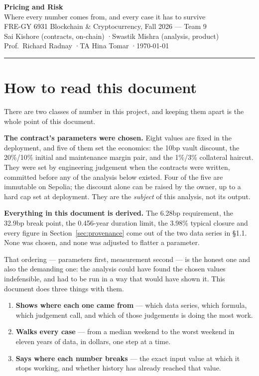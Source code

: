 \documentclass[11pt,a4paper]{article}
\begin{document}
\begin{center}
{\LARGE\bfseries Pricing and Risk}\\[4pt]
{\large Where every number comes from, and every case it has to survive}\\[10pt]
{\normalsize FRE-GY 6931 Blockchain \& Cryptocurrency, Fall 2026 — Team 9}\\[2pt]
{\small Sai Kishore (contracts, on-chain) \quad·\quad Swastik Mishra (analysis, product)}\\[2pt]
{\small Prof.\ Richard Radnay \quad·\quad TA Hina Tomar \quad·\quad \today}
\end{center}
\vspace{4pt}

\hrule
\vspace{10pt}

\section*{How to read this document}

There are two classes of number in this project, and keeping them apart is the whole
point of this document.

\textbf{The contract's parameters were chosen.} Eight values are fixed in the deployment,
and five of them set the economics: the 10bp vault discount, the 20\%/10\% initial and
maintenance margin pair, and the 1\%/3\% collateral haircut. They were set by engineering
judgement when the contracts were written, committed before any of the analysis below
existed. Four of the five are immutable on Sepolia; the discount alone can be raised by the owner,
up to a hard cap set at deployment. They are the \emph{subject} of this analysis,
not its output.

\textbf{Everything in this document is derived.} The 6.28bp requirement, the 32.9bp break
point, the 0.456-year duration limit, the 3.98\% typical closure and every figure in
Section~\ref{sec:provenance} come out of the two data series in \S1.1. None was chosen,
and none was adjusted to flatter a parameter.

That ordering — parameters first, measurement second — is the honest one and also the
demanding one: the analysis could have found the chosen values indefensible, and had to be
run in a way that would have shown it. This document does three things with them.

\begin{enumerate}
\item \textbf{Shows where each one came from} — which data series, which formula, which
      judgement call, and which of those judgements is doing the most work.
\item \textbf{Walks every case} — from a median weekend to the worst weekend in eleven
      years of data, in dollars, one step at a time.
\item \textbf{Says where each number breaks} — the exact input value at which it stops
      working, and whether history has already reached that value.
\end{enumerate}
\end{document}
